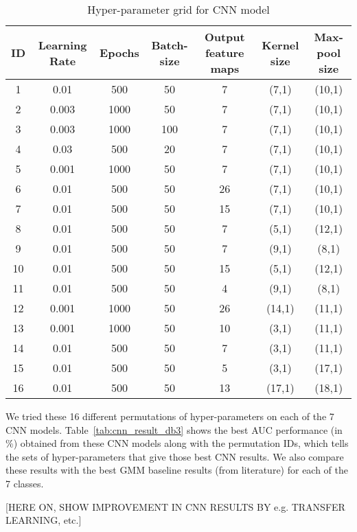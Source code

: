 \begin{table}[tb]
\caption[Hyper-parameter grid for CNN model]{Hyper-parameter grid for CNN model}
\label{tab:hyper_param_grid_cnn_db3}
\centering
\begin{tabular}{ccccccc}
\toprule
ID & Learning Rate & Epochs & Batch-size & Output feature maps & Kernel size & Max-pool size \\
\midrule
1	& 0.01 & 500 & 50 & 7 & (7,1) & (10,1)\\
2	& 0.003 & 1000 & 50 & 7 & (7,1) & (10,1)\\
3   & 0.003 & 1000 & 100 & 7 & (7,1) & (10,1)\\
4 	& 0.03 & 500 & 20 & 7 & (7,1) &  (10,1)\\
5   & 0.001 & 1000 & 50 & 7 & (7,1) & (10,1)\\
6   & 0.01 & 500 & 50 & 26 & (7,1) &  (10,1)\\
7   & 0.01 & 500 & 50 & 15 & (7,1) &  (10,1)\\
8   & 0.01 & 500 & 50 & 7 & (5,1) &  (12,1)\\
9   & 0.01 & 500 & 50 & 7 & (9,1) & (8,1)\\
10   & 0.01 & 500 & 50 & 15 & (5,1) & (12,1)\\
11   & 0.01 & 500 & 50 & 4 & (9,1) & (8,1)\\
12   & 0.001 & 1000 & 50 & 26 & (14,1) & (11,1)\\
13   & 0.001 & 1000 & 50 & 10 & (3,1) & (11,1)\\
14   & 0.01 & 500 & 50 & 7 & (3,1) &  (11,1)\\
15   & 0.01 & 500 & 50 & 5 & (3,1) & (17,1)\\
16   & 0.01 & 500 & 50 & 13 & (17,1) & (18,1)\\
\bottomrule 
\end{tabular}
\end{table}

We tried these 16 different permutations of hyper-parameters on each of the 7 CNN models. Table~\ref{tab:cnn_result_db3} shows the best AUC performance (in \%) obtained from these CNN models along with the permutation IDs, which tells the sets of hyper-parameters that give those best CNN results. We also compare these results with the best GMM baseline results (from literature) for each of the 7 classes.

[HERE ON, SHOW IMPROVEMENT IN CNN RESULTS BY e.g. TRANSFER LEARNING, etc.]

